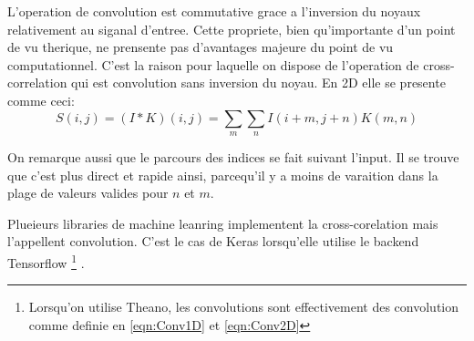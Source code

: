 L'operation de convolution est commutative grace a l'inversion du noyaux relativement au siganal d'entree. Cette propriete, bien qu'importante d'un point de vu therique, ne prensente pas d'avantages majeure du point de vu computationnel. C'est la raison pour laquelle on dispose de l'operation de cross-correlation qui est convolution sans inversion du noyau. En 2D elle se presente comme ceci:
\begin{equation}
 S(i,j) = (I * K)(i,j) = \sum_{m}\sum_{n} I(i+m,j+n)K(m,n)
 \label{eqn:Corr2D}
\end{equation}

On remarque aussi que le parcours des indices se fait suivant l'input. Il se trouve que c'est plus direct et rapide ainsi, parcequ'il y a moins de varaition dans la plage de valeurs valides pour $n$ et $m$. 

Plueieurs libraries de machine leanring implementent la cross-corelation mais l'appellent convolution. C'est le cas de Keras lorsqu'elle utilise le backend Tensorflow \footnote{Lorsqu'on utilise Theano, les convolutions sont effectivement des convolution comme definie en \ref{eqn:Conv1D} et \ref{eqn:Conv2D}} \parencite{Reference6}.
% 
% 


